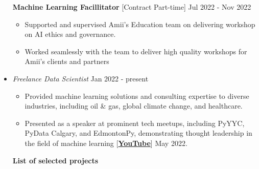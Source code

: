 \documentclass[10pt,letterpaper,roman]{moderncv} %
\begin{document}
\begin{itemize}
        \textbf{Machine Learning Facillitator} [Contract Part-time] \hfill Jul 2022 - Nov 2022
        \begin{itemize}
			\item Supported and supervised Amii's Education team on delivering workshop on AI ethics and governance.

			   \item Worked seamlessly with the team to deliver high quality workshops for Amii's clients and partners

		\end{itemize}
		
\vspace{0.5cm}
	\item \href{https://hadi2525.github.io}{} \emph{\large Freelance Data Scientist} \hfill Jan 2022 - present
	\vspace{0.25cm}
	
	\begin{itemize}
		\item Provided machine learning solutions and consulting expertise to diverse industries, including oil \& gas, global climate change, and healthcare.
		
		\item Presented as a speaker at prominent tech meetups, including PyYYC, PyData Calgary, and EdmontonPy, demonstrating thought leadership in the field of machine learning [\href{https://www.youtube.com/watch?v=4S_QGDHTICw}{\textbf{YouTube}}] \hfill May 2022.
	\end{itemize}
	\textbf{List of selected projects}
	\begin{itemize}
		
		

\end{itemize}
\end{itemize}
\end{document}
